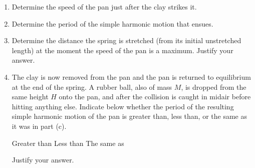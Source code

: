 {\begin{enumerate}[leftmargin=12pt]
\begin{enumerate}
    \item Determine the speed of the pan just after the clay strikes it.

    \item Determine the period of the simple harmonic motion that ensues.

    \item Determine the distance the spring is stretched (from its initial
      unstretched length) at the moment the speed of the pan is a maximum.
      Justify your answer.

    \item The clay is now removed from the pan and the pan is returned to
      equilibrium at the end of the spring. A rubber ball, also of mass $M$, is
      dropped from the same height $H$ onto the pan, and after the collision is
      caught in midair before hitting anything else. Indicate below whether the
      period of the resulting simple harmonic motion of the pan is greater than,
      less than, or the same as it was in part (c).

      \vspace{.1in}
      \underline{\hspace{.3in}} Greater than\hspace{.4in}
      \underline{\hspace{.3in}} Less than\hspace{.4in}
      \underline{\hspace{.3in}} The same as

      \vspace{.1in}Justify your answer.
    \end{enumerate}
  \end{enumerate}
}
